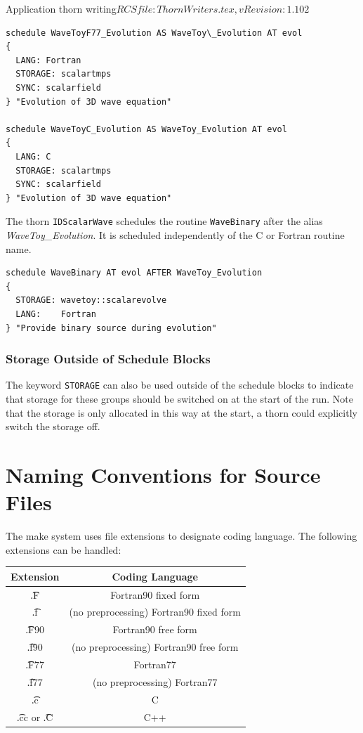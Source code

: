 \begin{cactuspart}{2}{Application thorn writing}{$RCSfile: ThornWriters.tex,v $}{$Revision: 1.102 $}
\begin{verbatim}
schedule WaveToyF77_Evolution AS WaveToy\_Evolution AT evol
{
  LANG: Fortran
  STORAGE: scalartmps
  SYNC: scalarfield
} "Evolution of 3D wave equation"

schedule WaveToyC_Evolution AS WaveToy_Evolution AT evol
{
  LANG: C
  STORAGE: scalartmps
  SYNC: scalarfield
} "Evolution of 3D wave equation"
\end{verbatim}

The thorn {\tt IDScalarWave} schedules the routine {\tt WaveBinary}
after the alias {\em WaveToy\_Evolution}. It is scheduled independently of
the C or Fortran routine name.

\begin{verbatim}
schedule WaveBinary AT evol AFTER WaveToy_Evolution
{
  STORAGE: wavetoy::scalarevolve
  LANG:    Fortran
} "Provide binary source during evolution"
\end{verbatim}

\subsubsection{Storage Outside of Schedule Blocks}

The keyword {\tt STORAGE} can also be used outside
of the schedule blocks to indicate that storage for these
groups should be switched on at the start of the run. Note that
the storage is only allocated in this way at the start,
a thorn could explicitly switch the storage off.





\section{Naming Conventions for Source Files}
\label{nacofosofi}

The make system uses file extensions
to designate coding language. The following extensions can be handled:

\begin{center}
\begin{tabular}{|c|c|}
\hline
Extension & Coding Language \\
\hline
{\t .F} & Fortran90 fixed form \\
{\t .f} & (no preprocessing) Fortran90 fixed form\\
{\t .F90} & Fortran90 free form\\
{\t .f90} & (no preprocessing) Fortran90 free form\\
{\t .F77} & Fortran77 \\
{\t .f77} & (no preprocessing) Fortran77\\
{\t .c} & C \\
{\t .cc} or {\t .C} & C++ \\
\hline
\end{tabular}
\end{center}


\end{cactuspart}
